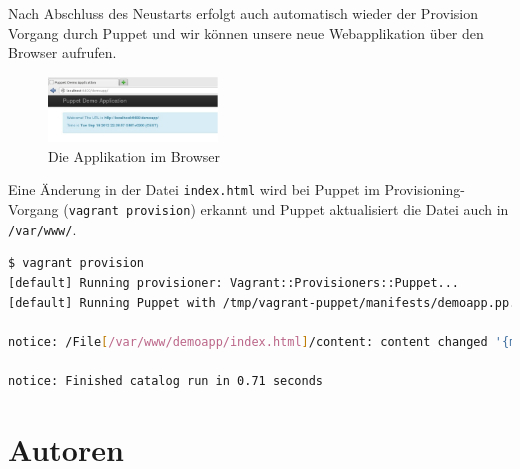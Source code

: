 \documentclass[12pt,a4paper,ngerman]{article}
\begin{document}
Nach Abschluss des Neustarts erfolgt auch automatisch wieder der Provision Vorgang durch Puppet und wir können unsere neue Webapplikation über den Browser aufrufen.
\begin{figure}
  \begin{center}
    \includegraphics[width=0.4\textwidth]{images/demoapp.pdf}
  \end{center}
  \caption{Die Applikation im Browser}
  \label{demoapp}
\end{figure}

Eine Änderung in der Datei \lstinline$index.html$ wird bei Puppet im Provisioning-Vorgang (\lstinline$vagrant provision$) erkannt und Puppet aktualisiert die Datei auch in \lstinline$/var/www/$.
\begin{lstlisting}[language=sh,caption=Puppet Provisioning nach Änderung von index.html, label=provisionapp]
$ vagrant provision
[default] Running provisioner: Vagrant::Provisioners::Puppet...
[default] Running Puppet with /tmp/vagrant-puppet/manifests/demoapp.pp...

notice: /File[/var/www/demoapp/index.html]/content: content changed '{md5}90a8d419b9c7b43b09ba73abebaf8f4c' to '{md5}0a4ee5bb63c3e5c29cc54cf36a4be23c'

notice: Finished catalog run in 0.71 seconds
\end{lstlisting}


\section*{Autoren}
\end{document}
